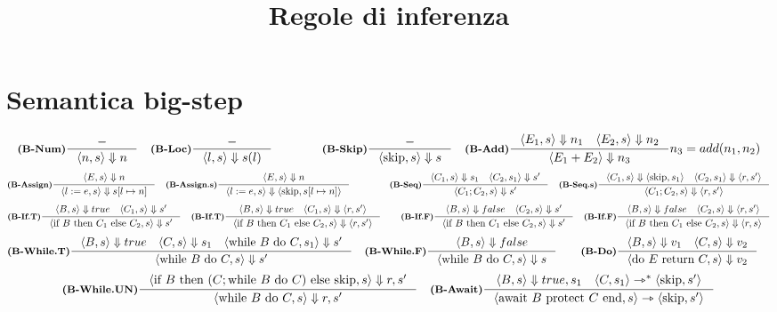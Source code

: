 \documentclass[a4paper, 10pt]{article}
\date{}
\title{\textbf{Regole di inferenza}}
\newcommand{\skipp}{\textup{skip}}
\newcommand{\infer}[4]{\inference[\textbf{#1}]{#2}{#3}#4 }
\newcommand{\brule}[2]{\langle #1 \rangle \Downarrow #2}
\newcommand{\srule}[2]{\langle #1 \rangle \rightarrowtriangle \langle #2 \rangle}
\newcommand{\ssrule}[2]{\langle #1 \rangle \rightarrowtriangle^{*} \langle #2 \rangle}
\newcommand{\memrep}[3]{#1 \lbrack #2 \mapsto #3 \rbrack}
\newcommand{\ifthenelse}[3]{\text{if } #1 \text{ then } #2 \text{ else } #3}
\newcommand{\whiledo}[2]{\text{while } #1 \text{ do } #2}
\newcommand{\doreturn}[2]{\text{do } #1 \text{ return } #2}
\newcommand{\awaitprotectend}[2]{\text{await } #1 \text{ protect } #2 \text{ end}}
\begin{document}
	\maketitle
	\section*{Semantica big-step}
	\begin{align*}
		&\infer{(B-Num)}{-}{\brule{n,s}{n}}{}	
		&\infer{(B-Loc)}{-}{\brule{l,s}{s(l)}}{}\qquad\qquad
		&\infer{(B-Skip)}{-}{\brule{\skipp,s}{s}}{} 
		&\infer{(B-Add)}{\brule{E_1,s}{n_1} \quad \brule{E_2,s}{n_2}}{\brule{E_1+E_2}{n_3}}{n_3 = add(n_1, n_2)}
	\end{align*}
	\begin{align*}
		&\infer{(B-Assign)}{\brule{E,s}{n}}{\brule{l:=e,s}{\memrep{s}{l}{n}}}{}  &\infer{(B-Assign.s)}{\brule{E,s}{n}}{\brule{l:=e,s}{\langle \skipp, \memrep{s}{l}{n}} \rangle}{} \qquad\qquad
		&\infer{(B-Seq)}{\brule{C_1,s}{s_1} \quad \brule{C_2,s_1}{s'} }{\brule{C_1;C_2,s}{s'}}{} 
		&\infer{(B-Seq.s)}{\brule{C_1,s}{\langle \skipp,s_1 \rangle} \quad \brule{C_2,s_1}{\langle r,s' \rangle} }{\brule{C_1;C_2,s}{\langle r,s' \rangle}}{}
	\end{align*}
	\begin{align*}
		&\infer{(B-If.T)}{\brule{B,s}{true} \quad \brule{C_1,s}{s'}}{\brule{\ifthenelse{B}{C_1}{C_2},s}{s'}}{} 
		&\infer{(B-If.T)}{\brule{B,s}{true} \quad \brule{C_1,s}{\langle r,
				s'\rangle}}{\brule{\ifthenelse{B}{C_1}{C_2},s}{\langle r, s'\rangle}}{} \qquad
		&\infer{(B-If.F)}{\brule{B,s}{false} \quad \brule{C_2,s}{s'}}{\brule{\ifthenelse{B}{C_1}{C_2},s}{s'}}{}
		&\infer{(B-If.F)}{\brule{B,s}{false} \quad \brule{C_2,s}{\langle r, s'\rangle}}{\brule{\ifthenelse{B}{C_1}{C_2},s}{\langle r, s\rangle}}{}
	\end{align*}
	\begin{align*}
		&\infer{(B-While.T)}{\brule{B, s}{true}\quad \brule{C, s}{s_1}\quad \brule{\whiledo{B}{C}, s_1}{s'}}{\brule{\whiledo{B}{C}, s}{s'}}{}
		&\infer{(B-While.F)}{\brule{B, s}{false}}{\brule{\whiledo{B}{C}, s}{s}}{} \qquad
		&\infer{(B-Do)}{\brule{B,s}{v_1}\quad \brule{C,s}{v_2}}{\brule{\doreturn{E}{C}, s}{v_2}}{}
	\end{align*}
	\begin{align*}
		&\infer{(B-While.UN)}{\brule{\ifthenelse{B}{(C;\whiledo{B}{C})}{\skipp}, s}{r, s'}}{\brule{\whiledo{B}{C}, s}{r, s'}}{}
		&\infer{(B-Await)}{\brule{B, s}{true, s_1}\quad \ssrule{C, s_1}{\skipp, s'}}{\srule{\awaitprotectend{B}{C}, s}{\skipp, s'}}{}
	\end{align*}
\end{document}
